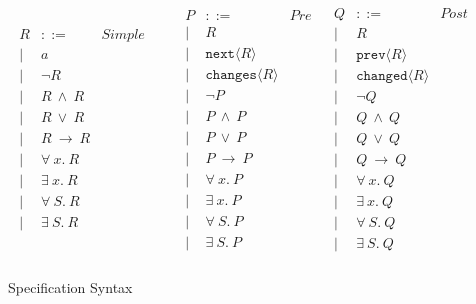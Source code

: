 \documentclass[12pt]{article}
\begin{document}
	\begin{figure}[h]
	\footnotesize
	\[
	\begin{array}{lll}
	\begin{array}{llr}
	R & ::= &\textit{Simple Assertion}\\ 
	| & a & \\
	| & \neg R & \\
	| & R\ \wedge\ R & \\
	| & R\ \vee\ R & \\
	| & R\ \longrightarrow\ R & \\
	| & \forall\ x.\ R & \\
	| & \exists\ x.\ R & \\
	| & \forall\ S.\ R & \\
	| & \exists\ S.\ R & \\
	\end{array}&
	\begin{array}{llr}
	P & ::= &\textit{Pre}\\ 
	| & R & \\
	| & \texttt{next}\langle  R \rangle& \\
	| & \texttt{changes}\langle  R \rangle& \\
	| & \neg P & \\
	| & P\ \wedge\ P & \\
	| & P\ \vee\ P & \\
	| & P\ \longrightarrow\ P & \\
	| & \forall\ x.\ P & \\
	| & \exists\ x.\ P & \\
	| & \forall\ S.\ P & \\
	| & \exists\ S.\ P & \\
	\end{array}&
	\begin{array}{llr}
	Q & ::= & \textit{Post}\\ 
	| & R & \\
	| & \texttt{prev}\langle  R \rangle& \\
	| & \texttt{changed}\langle  R \rangle& \\
	| & \neg Q & \\
	| & Q\ \wedge\ Q & \\
	| & Q\ \vee\ Q & \\
	| & Q\ \longrightarrow\ Q & \\
	| & \forall\ x.\ Q & \\
	| & \exists\ x.\ Q & \\
	| & \forall\ S.\ Q & \\
	| & \exists\ S.\ Q & \\
	\end{array}
	\end{array}
	\]
	\normalsize
	\caption{Specification Syntax}
	\label{f:specs}
	\end{figure}
	
\end{document}
